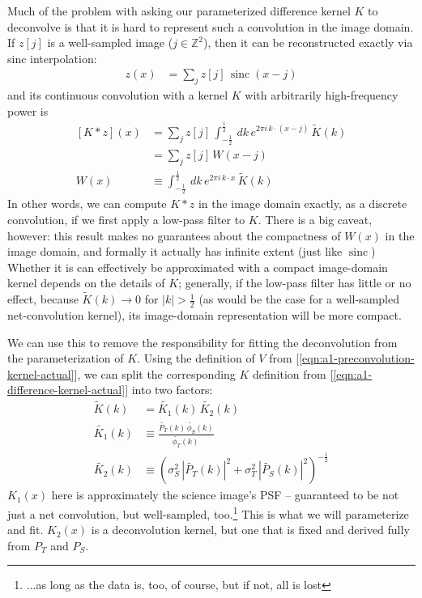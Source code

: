 \documentclass[DM,authoryear,toc]{lsstdoc}
\DeclareMathOperator{\sinc}{sinc}
\begin{document}
Much of the problem with asking our parameterized difference kernel $K$ to deconvolve is that it is hard to represent such a convolution in the image domain.
If $z[j]$ is a well-sampled image ($j \in \mathbb{Z}^2$), then it can be reconstructed exactly via sinc interpolation:
\begin{align}
  z(x) & = \sum_j z[j] \, \sinc(x - j)
\end{align}
and its continuous convolution with a kernel $K$ with arbitrarily high-frequency power is
\begin{align}
  \left[K \ast z\right](x) &= \sum_j z[j] \, \int_{-\frac{1}{2}}^{\frac{1}{2}} \, dk \,
    e^{2\pi i \, k \cdot (x - j)} \, \widetilde{K}(k) \\
      &= \sum_j z[j] \, W(x -j) \\
  W(x) &\equiv \int_{-\frac{1}{2}}^{\frac{1}{2}} \, dk \,
    e^{2\pi i \, k \cdot x} \, \widetilde{K}(k)
\end{align}
In other words, we can compute $K \ast z$ in the image domain exactly, as a discrete convolution, if we first apply a low-pass filter to $K$.
There is a big caveat, however: this result makes no guarantees about the compactness of $W(x)$ in the image domain, and formally it actually has infinite extent (just like $\sinc$)
Whether it is can effectively be approximated with a compact image-domain kernel depends on the details of $K$; generally, if the low-pass filter has little or no effect, because $\widetilde{K}(k) \rightarrow 0$ for $|k| > \frac{1}{2}$ (as would be the case for a well-sampled net-convolution kernel), its image-domain representation will be more compact.

We can use this to remove the responsibility for fitting the deconvolution from the parameterization of $K$.
Using the definition of $V$ from [\ref{eqn:a1-preconvolution-kernel-actual}], we can split the corresponding $K$ definition from [\ref{eqn:a1-difference-kernel-actual}] into two factors:
\begin{align}
  \widetilde{K}(k) & = \widetilde{K_1}(k) \, \widetilde{K_2}(k) \\
  \widetilde{K_1}(k) & \equiv
  \frac{
      \widetilde{P_T}(k) \, \widetilde{\phi_S}(k)
  }{
    \widetilde{\phi_T}(k) \,
  } \\
  \widetilde{K_2}(k) & \equiv \left(
      \sigma_S^2 \, \left|\widetilde{P_T}(k)\right|^2
      + \sigma_T^2 \, \left|\widetilde{P_S}(k)\right|^2
    \right)^{-\frac{1}{2}}
\end{align}
$K_1(x)$ here is approximately the science image's PSF -- guaranteed to be not just a net convolution, but well-sampled, too.\footnote{...as long as the data is, too, of course, but if not, all is lost}
This is what we will parameterize and fit.
$K_2(x)$ is a deconvolution kernel, but one that is fixed and derived fully from $P_T$ and $P_S$.
\end{document}
